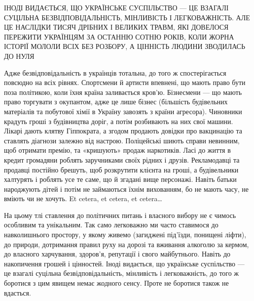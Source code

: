 \begin{zznagolos}
ІНОДІ ВИДАЄТЬСЯ, ЩО УКРАЇНСЬКЕ СУСПІЛЬСТВО — ЦЕ ВЗАГАЛІ СУЦІЛЬНА
БЕЗВІДПОВІДАЛЬНІСТЬ, МІНЛИВІСТЬ І ЛЕГКОВАЖНІСТЬ. АЛЕ ЦЕ НАСЛІДКИ ТИСЯЧ ДРІБНИХ
І ВЕЛИКИХ ТРАВМ, ЯКІ ДОВЕЛОСЯ ПЕРЕЖИТИ УКРАЇНЦЯМ ЗА ОСТАННЮ СОТНЮ РОКІВ, КОЛИ
ЖОРНА ІСТОРІЇ МОЛОЛИ ВСІХ БЕЗ РОЗБОРУ, А ЦІННІСТЬ ЛЮДИНИ ЗВОДИЛАСЬ ДО НУЛЯ	
\end{zznagolos}

Адже безвідповідальність в українців тотальна, до того ж спостерігається
повсюдно на всіх рівнях. Спортсмени й артисти впевнені, що мають право бути
поза політикою, коли їхня країна заливається кров’ю. Бізнесмени — що мають
право торгувати з окупантом, адже це лише бізнес (більшість будівельних
матеріалів та побутової хімії в Україну завозять з країни агресора). Чиновники
крадуть гроші з будівництва доріг, а потім розбивають на них свої машини.
Лікарі дають клятву Гіппократа, а згодом продають довідки про вакцинацію та
ставлять діагнози залежно від настрою. Поліцейські шиють справи невинним, щоб
отримати премію, та «кришують» продаж наркотиків. Ласі до життя в кредит
громадяни роблять заручниками своїх рідних і друзів. Рекламодавці та продавці
постійно брешуть, щоб розкрутити клієнта на гроші, а будівельники халтурять і
роблять усе те саме, що й згадані вище персонажі. Навіть батьки народжують
дітей і потім не займаються їхнім вихованням, бо не мають часу, не вміють чи не
хочуть. Et cetera, et cetera, et cetera…

На цьому тлі ставлення до політичних питань і власного вибору не є чимось
особливим та унікальним. Так само легковажно ми часто ставимося до
навколишнього простору, у якому живемо (загиджені під’їзди, понищені ліфти), до
природи, дотримання правил руху на дорозі та вживання алкоголю за кермом, до
власного харчування, здоров’я, репутації і свого майбутнього. Навіть до
накопичення грошей і цінностей. Іноді видається, що українське суспільство — це
взагалі суцільна безвідповідальність, мінливість і легковажність, до того ж
боротися з цим явищем немає жодного сенсу. Проте не боротися також не вдасться.

